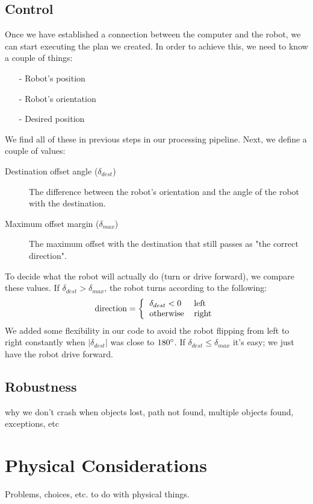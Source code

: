 \documentclass[10pt,twocolumn]{scrartcl}
\begin{document}
\subsection{Control}
Once we have established a connection between the computer and the robot, we can start executing the plan we created. In order to achieve this, we need to know a couple of things:
\begin{itemize}
	\item[-] Robot's position
	\item[-] Robot's orientation
	\item[-] Desired position
\end{itemize}
We find all of these in previous steps in our processing pipeline. Next, we define a couple of values:
\begin{description}
\item[Destination offset angle ($\delta_{dest}$)] The difference between the robot's orientation and the angle of the robot with the destination.
\item[Maximum offset margin ($\delta_{max}$)] The maximum offset with the destination that still passes as "the correct direction".
\end{description}
To decide what the robot will actually do (turn or drive forward), we compare these values. If $\delta_{dest} > \delta_{max}$, the robot turns according to the following:
\begin{align*}
\text{direction} = 
\left\{
\begin{tabular}{l l}
$\delta_{dest} < 0$ & left \\
otherwise & right 
\end{tabular}
\right.
\end{align*}
We added some flexibility in our code to avoid the robot flipping from left to right constantly when $\lvert \delta_{dest}\rvert$ was close to $180\degree$.
If $\delta_{dest} \leq \delta_{max}$ it's easy; we just have the robot drive forward.

\subsection{Robustness}
why we don't crash when objects lost, path not found, multiple objects found, exceptions, etc

\section{Physical Considerations}
Problems, choices, etc. to do with physical things.
\end{document}
